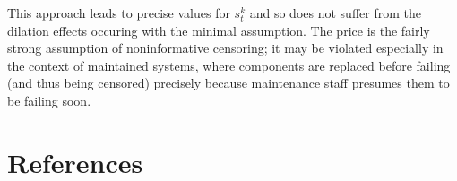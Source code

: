 \documentclass[12pt, a4paper]{elsarticle}
\begin{document}
This approach leads to precise values for $s_t^k$
and so does not suffer from the dilation effects occuring with the minimal assumption.
The price is the fairly strong assumption of noninformative censoring;
it may be violated especially in the context of maintained systems,
where components are replaced before failing (and thus being censored)
precisely because maintenance staff presumes them to be failing soon.









\section*{References}



\end{document}
